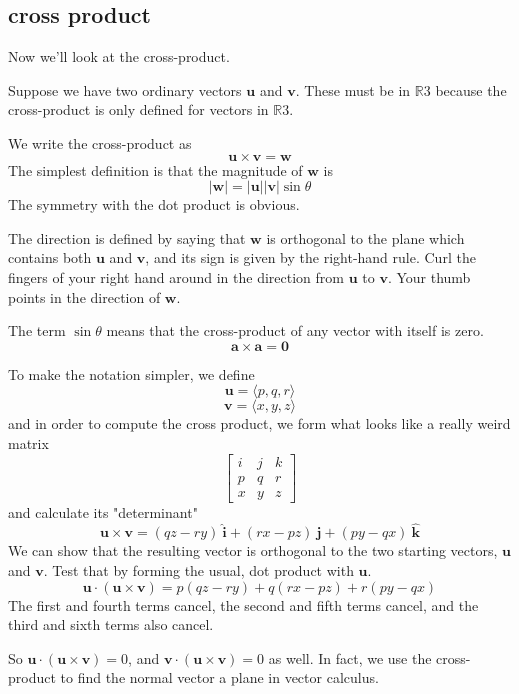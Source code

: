 \documentclass[11pt, oneside]{report}   	%
\begin{document}
\subsection*{cross product}

Now we'll look at the cross-product.  

Suppose we have two ordinary vectors $\mathbf{u}$ and $\mathbf{v}$.  These must be in $\mathbb{R}3$ because the cross-product is only defined for vectors in $\mathbb{R}3$.

We write the cross-product as
\[ \mathbf{u} \times \mathbf{v} = \mathbf{w}  \]
The simplest definition is that the magnitude of $\mathbf{w}$ is 
\[ |\mathbf{w}| = |\mathbf{u}| |\mathbf{v}| \sin \theta \]
The symmetry with the dot product is obvious.  

The direction is defined by saying that $\mathbf{w}$ is orthogonal to the plane which contains both $\mathbf{u}$ and $\mathbf{v}$, and its sign is given by the right-hand rule.  Curl the fingers of your right hand around in the direction from $\mathbf{u}$ to $\mathbf{v}$.  Your thumb points in the direction of $\mathbf{w}$.  

The term $\sin \theta$ means that the cross-product of any vector with itself is zero.
\[ \mathbf{a} \times \mathbf{a} = \mathbf{0}  \]

To make the notation simpler, we define
\[ \mathbf{u} = \langle p,q,r \rangle \]
\[ \mathbf{v} = \langle x,y,z \rangle \]
and in order to compute the cross product, we form what looks like a really weird matrix
\[
\begin{bmatrix} 
  i  &  j  &  k \\ 
  p  &  q & r \\
  x  &  y & z
\end{bmatrix}
\]
and calculate its "determinant"
\[ \mathbf{u} \times \mathbf{v}  = (qz - ry) \ \hat{\mathbf{i}} + (rx - pz) \  \hat{\mathbf{j}}  + (py - qx) \ \hat{\mathbf{k}}  \]
We can show that the resulting vector is orthogonal to the two starting vectors, $\mathbf{u}$ and $\mathbf{v}$.  Test that by forming the usual, dot product with $\mathbf{u}$.
\[ \mathbf{u} \cdot (\mathbf{u} \times \mathbf{v})  =  p(qz - ry) + q(rx - pz)   + r(py - qx)  \] 
The first and fourth terms cancel, the second and fifth terms cancel, and the third and sixth terms also cancel.  

So $\mathbf{u} \cdot (\mathbf{u} \times \mathbf{v}) = 0$, and $\mathbf{v} \cdot (\mathbf{u} \times \mathbf{v}) = 0$ as well.  In fact, we use the cross-product to find the normal vector a plane in vector calculus.
\end{document}
